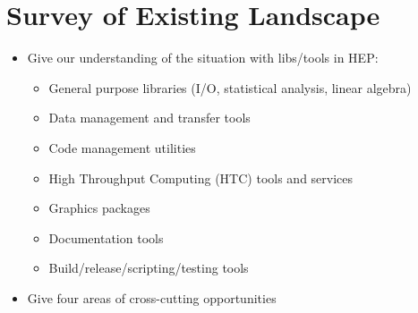 \section{Survey of Existing Landscape}


\begin{itemize}
\item Give our understanding of the situation with libs/tools in HEP:

  \begin{itemize}
  \item General purpose libraries (I/O, statistical analysis, linear algebra)
  \item Data management and transfer tools
  \item Code management utilities
  \item High Throughput Computing (HTC) tools and services
  \item Graphics packages
  \item Documentation tools
  \item Build/release/scripting/testing tools
  \end{itemize}

\item Give four areas of cross-cutting opportunities
\end{itemize}








